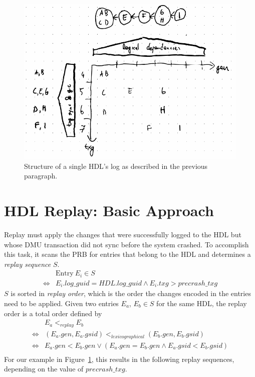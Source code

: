 \documentclass[12pt,a4paper,twoside]{book}
\begin{document}
\begin{figure}[H]
    \includegraphics{fig/prb_hdl_log_structure_example}
    \caption{Structure of a single HDL's log as described in the previous paragraph.}
    \label{fig:prb_hdl_log_structure_example}
\end{figure}

\section{HDL Replay: Basic Approach}\label{di:prb:replayapproach}
Replay must apply the changes that were successfully logged to the HDL but whose DMU transaction did not sync before the system crashed.
To accomplish this task, it scans the PRB for entries that belong to the HDL and determines a \textit{replay sequence} $S$.
\begin{align*}
    & \text{Entry}~E_i \in S \\
    \Leftrightarrow & E_i.log\_guid = HDL.log\_guid \wedge E_i.txg > precrash\_txg
\end{align*}
$S$ is sorted in \textit{replay order}, which is the order the changes encoded in the entries need to be applied.
Given two entries $E_a$, $E_b \in S$ for the same HDL, the replay order is a total order defined by
\begin{align*}
    & E_a <_{replay} E_b \\
    \Leftrightarrow &  (E_a.gen, E_a.gsid) <_{lexicographical} (E_b.gen, E_b.gsid) \\
    \Leftrightarrow & E_a.gen < E_b.gen \vee (E_a.gen = E_b.gen \wedge E_a.gsid < E_b.gsid) \\
\end{align*}
For our example in Figure~\ref{fig:prb_hdl_log_structure_example}, this results in the following replay sequences, depending on the value of $precrash\_txg$.
\end{document}
